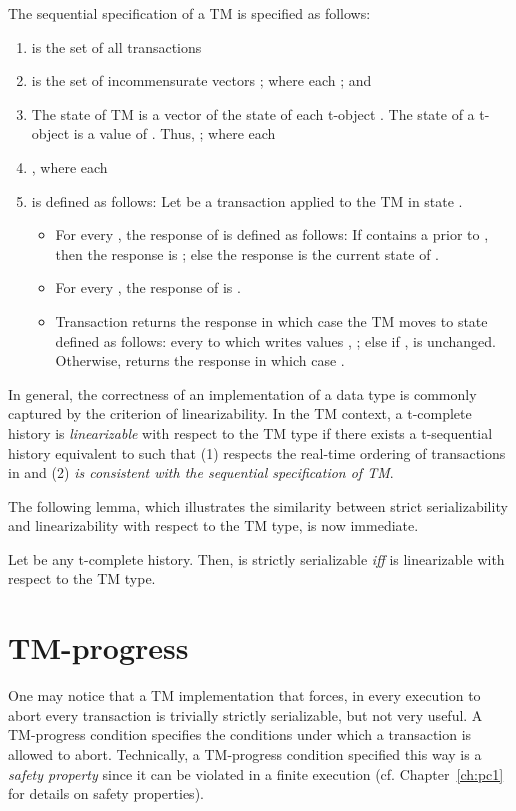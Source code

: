 The sequential specification of a TM is specified as follows:
\begin{enumerate}
\item
 is the set of all transactions 
\item 
 is the set of incommensurate vectors ; where each 
;   and 
\item 
The state of TM is a vector of the state of each t-object .
The state of a t-object  is a value  of .
Thus, ; where each 
\item 
, where each 
\item 
 is defined as follows:
Let  be a transaction
applied to the TM in state .
\begin{itemize}
\item For every , the response of  is defined as follows:
If  contains a  prior to , then the response is ; else the response is the current state of .
\item 
For every , the response of  is .
\item
Transaction  returns the response  in which case the TM moves to state  defined as follows:
every  to which  writes values , ; else if ,  is unchanged.
Otherwise,  returns the response  in which case .
\end{itemize}
\end{enumerate}
In general, the correctness of an implementation of a data type is commonly captured by the criterion 
of linearizability.
In the TM context, a t-complete history  is \emph{linearizable} with 
respect to the TM type if there exists
a t-sequential history  equivalent to  such that
(1)  respects the real-time ordering of transactions in  and
(2) \emph{ is consistent with the sequential specification of TM}.

The following lemma, which illustrates the similarity between strict serializability
and linearizability with respect to the TM type, is now immediate.
\begin{lemma}
\label{lm:serlin}
Let  be any t-complete history. Then,  is strictly serializable \emph{iff}  is linearizable with respect to the
TM type.
\end{lemma}
\section{TM-progress}
\label{sec:tm-progress}
One may notice that a TM implementation that forces, in every execution to abort every transaction is trivially strictly
serializable, but not very useful.
A TM-progress condition specifies the conditions under which a transaction is allowed to abort.
Technically, a TM-progress condition specified this way is a \emph{safety property} since it can be violated
in a finite execution (cf. Chapter~\ref{ch:pc1} for details on safety properties).

